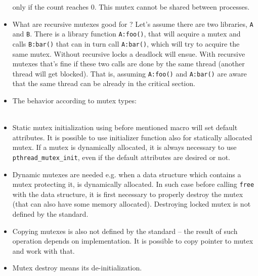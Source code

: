 \begin{itemize}
only if the count reaches 0. This mutex cannot be shared between processes.
\item What are recursive mutexes good for ? Let's assume there are two
libraries, \texttt{A} and \texttt{B}. There is a library
function \texttt{A:foo()}, that will acquire a mutex and calls \texttt{B:bar()}
that can in turn call \texttt{A:bar()}, which will try to acquire the same
mutex. Without recursive locks a deadlock will ensue. With recursive mutexes
that's fine if these two calls are done by the same thread (another thread will
get blocked). That is, assuming \texttt{A:foo()} and \texttt{A:bar()} are aware
that the same thread can be already in the critical section.
\item \label{MUTEXTAB} The behavior according to mutex types:\\
\\
\item Static mutex initialization using before mentioned macro will set default
attributes. It is possible to use initializer function also for statically
allocated mutex. If a mutex is dynamically allocated, it is always necessary to
use \texttt{pthread\_mutex\_init}, even if the default attributes are desired or
not.
\item Dynamic mutexes are needed e.g. when a data structure which contains a
mutex protecting it, is dynamically allocated.
In such case before calling \texttt{free} with the data structure, it is first
necessary to properly destroy the mutex (that can also have some memory
allocated). Destroying locked mutex is not defined by the standard.
\item Copying mutexes is also not defined by the standard -- the result of such
operation depends on implementation. It is possible to copy pointer to mutex
and work with that.
\item Mutex destroy means its de-initialization.
\end{itemize}

